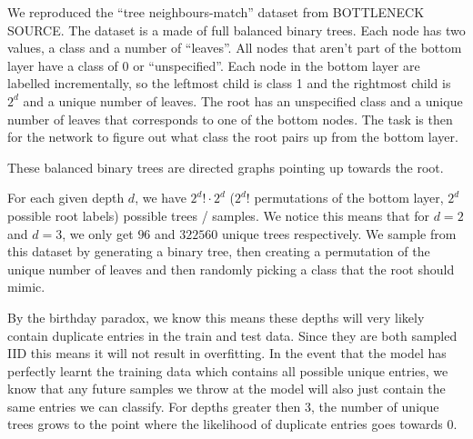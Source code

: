 \documentclass[a4paper,12pt]{article}
\begin{document}
We reproduced the ``tree neighbours-match'' dataset from BOTTLENECK SOURCE.
The dataset is a made of full balanced binary trees. Each node has two values, a class and a number of ``leaves''. All nodes that aren't part of the bottom layer have a class of 0 or ``unspecified''. Each node in the bottom layer are labelled incrementally, so the leftmost child is class 1 and the rightmost child is $2^{d}$ and a unique number of leaves. The root has an unspecified class and a unique number of leaves that corresponds to one of the bottom nodes. The task is then for the network to figure out what class the root pairs up from the bottom layer.

These balanced binary trees are directed graphs pointing up towards the root.

For each given depth $d$, we have $2^{d}! \cdot 2^{d}$ ($2^{d}!$ permutations of the bottom layer, $2^{d}$ possible root labels) possible trees / samples. We notice this means that for $d=2$ and $d=3$, we only get $96$ and $322560$ unique trees respectively.
We sample from this dataset by generating a binary tree, then creating a permutation of the unique number of leaves and then randomly picking a class that the root should mimic.

By the birthday paradox, we know this means these depths will very likely contain duplicate entries in the train and test data. Since they are both sampled IID this means it will not result in overfitting. In the event that the model has perfectly learnt the training data which contains all possible unique entries, we know that any future samples we throw at the model will also just contain the same entries we can classify.
For depths greater then 3, the number of unique trees grows to the point where the likelihood of duplicate entries goes towards 0.




\printbibliography
\end{document}
